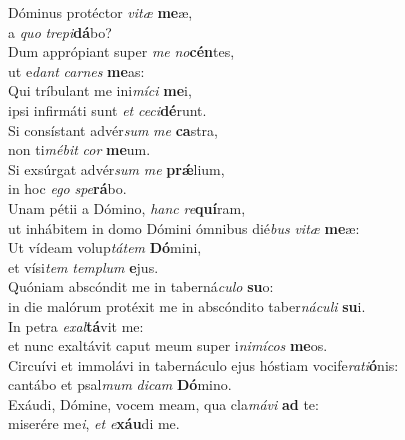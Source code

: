 \evenverse Dóminus protéctor \textit{vi}\textit{tæ} \textbf{me}æ,~\*\\
\evenverse a \textit{quo} \textit{tre}\textit{pi}\textbf{dá}bo?\\
\oddverse Dum apprópiant super \textit{me} \textit{no}\textbf{cén}tes,~\*\\
\oddverse ut e\textit{dant} \textit{car}\textit{nes} \textbf{me}as:\\
\evenverse Qui tríbulant me ini\textit{mí}\textit{ci} \textbf{me}i,~\*\\
\evenverse ipsi infirmáti sunt \textit{et} \textit{ce}\textit{ci}\textbf{dé}runt.\\
\oddverse Si consístant advér\textit{sum} \textit{me} \textbf{ca}stra,~\*\\
\oddverse non ti\textit{mé}\textit{bit} \textit{cor} \textbf{me}um.\\
\evenverse Si exsúrgat advér\textit{sum} \textit{me} \textbf{prǽ}lium,~\*\\
\evenverse in hoc \textit{e}\textit{go} \textit{spe}\textbf{rá}bo.\\
\oddverse Unam pétii a Dómino, \textit{hanc} \textit{re}\textbf{quí}ram,~\*\\
\oddverse ut inhábitem in domo Dómini ómnibus dié\textit{bus} \textit{vi}\textit{tæ} \textbf{me}æ:\\
\evenverse Ut vídeam volup\textit{tá}\textit{tem} \textbf{Dó}mini,~\*\\
\evenverse et vísi\textit{tem} \textit{tem}\textit{plum} \textbf{e}jus.\\
\oddverse Quóniam abscóndit me in taberná\textit{cu}\textit{lo} \textbf{su}o:~\*\\
\oddverse in die malórum protéxit me in abscóndito taber\textit{ná}\textit{cu}\textit{li} \textbf{su}i.\\
\evenverse In petra \textit{e}\textit{xal}\textbf{tá}vit me:~\*\\
\evenverse et nunc exaltávit caput meum super i\textit{ni}\textit{mí}\textit{cos} \textbf{me}os.\\
\oddverse Circuívi et immolávi in tabernáculo ejus hóstiam vocife\textit{ra}\textit{ti}\textbf{ó}nis:~\*\\
\oddverse cantábo et psal\textit{mum} \textit{di}\textit{cam} \textbf{Dó}mino.\\
\evenverse Exáudi, Dómine, vocem meam, qua cla\textit{má}\textit{vi} \textbf{ad} te:~\*\\
\evenverse miserére me\textit{i}, \textit{et} \textit{e}\textbf{xáu}di me.\\
